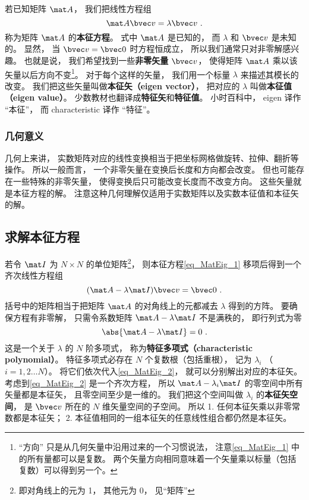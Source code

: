 

若已知矩阵 $\mat A$， 我们把线性方程组
\begin{equation}\label{eq_MatEig_1}
\mat A \bvec v = \lambda \bvec v~.
\end{equation}
称为矩阵 $\mat A$ 的\textbf{本征方程}。 式中 $\mat A$ 是已知的， 而 $\lambda$ 和 $\bvec v$ 是未知的。 显然， 当 $\bvec v = \bvec 0$ 时方程恒成立， 所以我们通常只对非零解感兴趣。 也就是说， 我们希望找到一些\textbf{非零矢量} $\bvec v$， 使得矩阵 $\mat A$ 乘以该矢量以后方向不变\footnote{“方向” 只是从几何矢量中沿用过来的一个习惯说法， 注意\autoref{eq_MatEig_1} 中的所有量都可以是复数。 两个矢量方向相同意味着一个矢量乘以标量（包括复数）可以得到另一个。}。 对于每个这样的矢量， 我们用一个标量 $\lambda$ 来描述其模长的改变。 我们把这些矢量叫做\textbf{本征矢（eigen vector）}， 把对应的 $\lambda$ 叫做\textbf{本征值（eigen value）}。 少数教材也翻译成\textbf{特征矢}和\textbf{特征值}。 小时百科中， eigen 译作 “本征”， 而 characteristic 译作 “特征”。

\subsubsection{几何意义}
几何上来讲， 实数矩阵对应的线性变换相当于把坐标网格做旋转、拉伸、翻折等操作。%
所以一般而言， 一个非零矢量在变换后长度和方向都会改变。 但也可能存在一些特殊的非零矢量， 使得变换后只可能改变长度而不改变方向。 这些矢量就是本征方程的解。 注意这种几何理解仅适用于实数矩阵以及实数本征值和本征矢的解。

\subsection{求解本征方程}\label{sub_MatEig_1}

若令 $\mat I$ 为 $N\times N$ 的单位矩阵\footnote{即对角线上的元为 1， 其他元为 0， 见“矩阵”}， 则本征方程\autoref{eq_MatEig_1} 移项后得到一个齐次线性方程组
\begin{equation}\label{eq_MatEig_2}
(\mat A - \lambda\mat I)\bvec v = \bvec 0~.
\end{equation}
括号中的矩阵相当于把矩阵 $\mat A$ 的对角线上的元都减去 $\lambda$ 得到的方阵。 要确保方程有非零解， 只需令系数矩阵 $\mat A - \lambda\mat I$ 不是满秩的， 即行列式为零
\begin{equation}\label{eq_MatEig_4}
\abs{\mat A - \lambda\mat I} = 0~.
\end{equation}
这是一个关于 $\lambda$ 的 $N$ 阶多项式， 称为\textbf{特征多项式（characteristic polynomial）}。 特征多项式必存在 $N$ 个复数根（包括重根），%
记为 $\lambda_i$ （$i = 1, 2\dots N$）。 将它们依次代入\autoref{eq_MatEig_2}， 就可以分别解出对应的本征矢。 考虑到\autoref{eq_MatEig_2} 是一个齐次方程， 所以 $\mat A - \lambda_i\mat I$ 的零空间中所有矢量都是本征矢， 且零空间至少是一维的。 我们把这个空间叫做 $\lambda_i$ 的\textbf{本征矢空间}， 是 $\bvec v$ 所在的 $N$ 维矢量空间的子空间。 所以 1. 任何本征矢乘以非零常数都是本征矢； 2. 本征值相同的一组本征矢的任意线性组合都仍然是本征矢。

